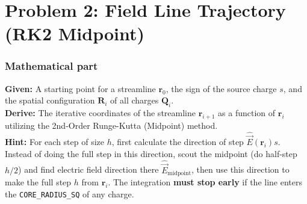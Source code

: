 \documentclass[11pt]{article}
\begin{document}
\vspace{1cm}

\section*{Problem 2: Field Line Trajectory (RK2 Midpoint)}

\subsubsection*{Mathematical part}
\textbf{Given:} A starting point for a streamline $\mathbf{r}_0$, the sign of the source charge $s$, and the spatial configuration $\mathbf{R}_i$ of all charges $\mathbf{Q}_i$. \\
\textbf{Derive:} The iterative coordinates of the streamline $\mathbf{r}_{i+1}$ as a function of $\mathbf{r}_i$ utilizing the 2nd-Order Runge-Kutta (Midpoint) method. \\
\textbf{Hint:} For each step of size $h$, first calculate the direction of step $\hat{\vec{E}}(\mathbf{r}_i) s$. Instead of doing the full step in this direction, scout the midpoint (do half-step $h/2$) and find electric field direction there $\hat{\vec{E}}_{\text{midpoint}}$, then use this direction to make the full step $h$ from $\mathbf{r}_i$.
The integration \textbf{must stop early} if the line enters the \lstinline|CORE_RADIUS_SQ| of any charge. \\
\end{document}

